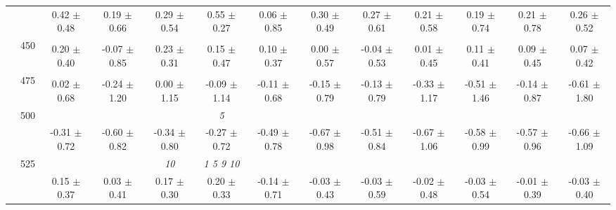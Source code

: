 \begin{table}[h]
{\begin{tabular}{
        ccccccccccccc}
 & & \cellcolor[HTML]{EFEFEF} 0.42 $\pm$ 0.48& \cellcolor[HTML]{EFEFEF} 0.19 $\pm$ 0.66& \cellcolor[HTML]{EFEFEF} 0.29 $\pm$ 0.54& \cellcolor[HTML]{EFEFEF} 0.55 $\pm$ 0.27& \cellcolor[HTML]{EFEFEF} 0.06 $\pm$ 0.85& \cellcolor[HTML]{EFEFEF} 0.30 $\pm$ 0.49& \cellcolor[HTML]{EFEFEF} 0.27 $\pm$ 0.61& \cellcolor[HTML]{EFEFEF} 0.21 $\pm$ 0.58& \cellcolor[HTML]{EFEFEF} 0.19 $\pm$ 0.74& \cellcolor[HTML]{EFEFEF} 0.21 $\pm$ 0.78& \cellcolor[HTML]{EFEFEF} 0.26 $\pm$ 0.52 \\ 
 & \multirow{2}{*}{450}& & & & & & & & & & &  \\ 
 & & 0.20 $\pm$ 0.40& -0.07 $\pm$ 0.85& 0.23 $\pm$ 0.31& 0.15 $\pm$ 0.47& 0.10 $\pm$ 0.37& 0.00 $\pm$ 0.57& -0.04 $\pm$ 0.53& 0.01 $\pm$ 0.45& 0.11 $\pm$ 0.41& 0.09 $\pm$ 0.45& 0.07 $\pm$ 0.42 \\ 
 & \multirow{2}{*}{475}& \cellcolor[HTML]{EFEFEF} & \cellcolor[HTML]{EFEFEF} & \cellcolor[HTML]{EFEFEF} & \cellcolor[HTML]{EFEFEF} & \cellcolor[HTML]{EFEFEF} & \cellcolor[HTML]{EFEFEF} & \cellcolor[HTML]{EFEFEF} & \cellcolor[HTML]{EFEFEF} & \cellcolor[HTML]{EFEFEF} & \cellcolor[HTML]{EFEFEF} & \cellcolor[HTML]{EFEFEF}  \\ 
 & & \cellcolor[HTML]{EFEFEF} 0.02 $\pm$ 0.68& \cellcolor[HTML]{EFEFEF} -0.24 $\pm$ 1.20& \cellcolor[HTML]{EFEFEF} 0.00 $\pm$ 1.15& \cellcolor[HTML]{EFEFEF} -0.09 $\pm$ 1.14& \cellcolor[HTML]{EFEFEF} -0.11 $\pm$ 0.68& \cellcolor[HTML]{EFEFEF} -0.15 $\pm$ 0.79& \cellcolor[HTML]{EFEFEF} -0.13 $\pm$ 0.79& \cellcolor[HTML]{EFEFEF} -0.33 $\pm$ 1.17& \cellcolor[HTML]{EFEFEF} -0.51 $\pm$ 1.46& \cellcolor[HTML]{EFEFEF} -0.14 $\pm$ 0.87& \cellcolor[HTML]{EFEFEF} -0.61 $\pm$ 1.80 \\ 
 & \multirow{2}{*}{500}& & & & \textit{ 5 }& & & & & & &  \\ 
 & & -0.31 $\pm$ 0.72& -0.60 $\pm$ 0.82& -0.34 $\pm$ 0.80& -0.27 $\pm$ 0.72& -0.49 $\pm$ 0.78& -0.67 $\pm$ 0.98& -0.51 $\pm$ 0.84& -0.67 $\pm$ 1.06& -0.58 $\pm$ 0.99& -0.57 $\pm$ 0.96& -0.66 $\pm$ 1.09 \\ 
 & \multirow{2}{*}{525}& \cellcolor[HTML]{EFEFEF} & \cellcolor[HTML]{EFEFEF} & \cellcolor[HTML]{EFEFEF} \textit{ 10 }& \cellcolor[HTML]{EFEFEF} \textit{  1  5  9 10 }& \cellcolor[HTML]{EFEFEF} & \cellcolor[HTML]{EFEFEF} & \cellcolor[HTML]{EFEFEF} & \cellcolor[HTML]{EFEFEF} & \cellcolor[HTML]{EFEFEF} & \cellcolor[HTML]{EFEFEF} & \cellcolor[HTML]{EFEFEF}  \\ 
 & & \cellcolor[HTML]{EFEFEF} 0.15 $\pm$ 0.37& \cellcolor[HTML]{EFEFEF} 0.03 $\pm$ 0.41& \cellcolor[HTML]{EFEFEF} 0.17 $\pm$ 0.30& \cellcolor[HTML]{EFEFEF} 0.20 $\pm$ 0.33& \cellcolor[HTML]{EFEFEF} -0.14 $\pm$ 0.71& \cellcolor[HTML]{EFEFEF} -0.03 $\pm$ 0.43& \cellcolor[HTML]{EFEFEF} -0.03 $\pm$ 0.59& \cellcolor[HTML]{EFEFEF} -0.02 $\pm$ 0.48& \cellcolor[HTML]{EFEFEF} -0.03 $\pm$ 0.54& \cellcolor[HTML]{EFEFEF} -0.01 $\pm$ 0.39& \cellcolor[HTML]{EFEFEF} -0.03 $\pm$ 0.40 \\ 

\end{tabular}}
\end{table}
